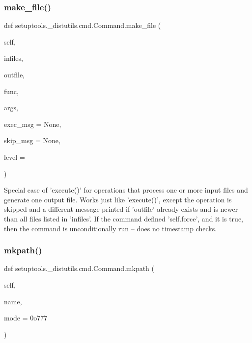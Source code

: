 \subsubsection{\texorpdfstring{make\+\_\+file()}{make\_file()}}
{\footnotesize\ttfamily def setuptools.\+\_\+distutils.\+cmd.\+Command.\+make\+\_\+file (\begin{DoxyParamCaption}\item[{}]{self,  }\item[{}]{infiles,  }\item[{}]{outfile,  }\item[{}]{func,  }\item[{}]{args,  }\item[{}]{exec\+\_\+msg = {\ttfamily None},  }\item[{}]{skip\+\_\+msg = {\ttfamily None},  }\item[{}]{level = {} }\end{DoxyParamCaption})}

\begin{DoxyVerb}Special case of 'execute()' for operations that process one or
more input files and generate one output file.  Works just like
'execute()', except the operation is skipped and a different
message printed if 'outfile' already exists and is newer than all
files listed in 'infiles'.  If the command defined 'self.force',
and it is true, then the command is unconditionally run -- does no
timestamp checks.
\end{DoxyVerb}
 \mbox{\label{classsetuptools_1_1__distutils_1_1cmd_1_1Command_af04c690e046e6c5c8d64fbc7f889fc4e}} 
\subsubsection{\texorpdfstring{mkpath()}{mkpath()}}
{\footnotesize\ttfamily def setuptools.\+\_\+distutils.\+cmd.\+Command.\+mkpath (\begin{DoxyParamCaption}\item[{}]{self,  }\item[{}]{name,  }\item[{}]{mode = {\ttfamily 0o777} }\end{DoxyParamCaption})}

